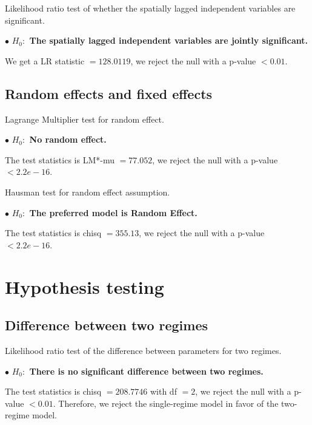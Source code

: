\documentclass[11pt,a4paper]{amsart}
\theoremstyle{plain}
\theoremstyle{definition}
\begin{document}
Likelihood ratio test of whether the spatially lagged independent variables are significant.

$\bullet$ \textbf{$H_{0}:$ The spatially lagged independent variables are jointly significant.} 

We get a LR statistic $= 128.0119$, we reject the null with a  p-value $< 0.01$. 

\subsection{Random effects and fixed effects}\hfill\par

Lagrange Multiplier test for random effect.

$\bullet$ \textbf{$H_{0}:$ No random effect.}

The test statistics is LM*-mu $= 77.052$, we reject the null with a p-value $< 2.2e-16$.

Hausman test for random effect assumption.

$\bullet$ \textbf{$H_{0}:$ The preferred model is Random Effect.}

The test statistics is chisq $= 355.13$, we reject the null with a p-value $< 2.2e-16$.

\section{Hypothesis testing}\hfill\par

\subsection{Difference between two regimes}\hfill\par

 Likelihood ratio test of the difference between parameters for two regimes.

$\bullet$ \textbf{$H_{0}:$ There is no significant difference between two regimes.}

The test statistics is chisq $= 208.7746$ with df $= 2$, we reject the null with a p-value $< 0.01$. Therefore, we reject the single-regime model in favor of the two-regime model.

\printbibliography
\end{document}
